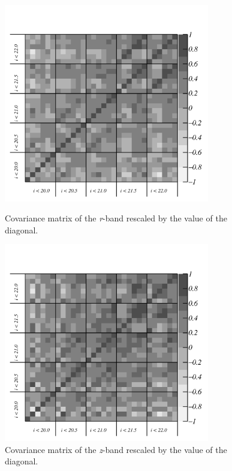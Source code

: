 \begin{figure}
\begin{center}
\includegraphics[width=0.8\textwidth,trim={0 0 0 2cm},clip]{./figures_appendix/cov_matrix_mag_auto_r.pdf}
\caption{Covariance matrix of the {\it r}-band rescaled by the value of the diagonal.}
\includegraphics[width=0.8\textwidth,trim={0 0 0 2cm},clip]{./figures_appendix/cov_matrix_mag_auto_z.pdf}
\caption{Covariance matrix of the {\it z}-band rescaled by the value of the diagonal.}
\end{center}
\end{figure}

